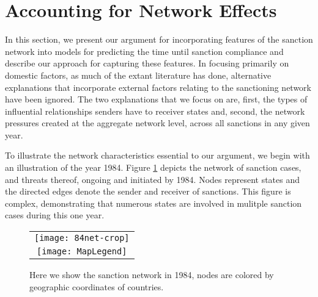 

\section*{Accounting for Network Effects}
\label{neteffects}

In this section, we present our argument for incorporating features of the sanction network into models for predicting the time until sanction compliance and describe our approach for capturing these features. In focusing primarily on domestic factors, as much of the extant literature has done, alternative explanations that incorporate external factors relating to the sanctioning network have been ignored. The two explanations that we focus on are, first, the types of influential relationships senders have to receiver states and, second, the network pressures created at the aggregate network level, across all sanctions in any given year. %

To illustrate the network characteristics essential to our argument, we begin with an illustration of the year 1984. Figure \ref{fig:spaghetti} depicts the network of sanction cases, and threats thereof, ongoing and initiated by 1984. Nodes represent states and the directed edges denote the sender and receiver of sanctions. This figure is complex, demonstrating that numerous states are involved in mulitple sanction cases during this one year.


\begin{figure}[ht]
  \centering
  \begin{tabular}{c}
	  \texttt{[image: 84net-crop]} \\
	  \texttt{[image: MapLegend]}
  \end{tabular}
  \caption{Here we show the sanction network in 1984, nodes are colored by geographic coordinates of countries.}
  \label{fig:spaghetti}
\end{figure}
\FloatBarrier

